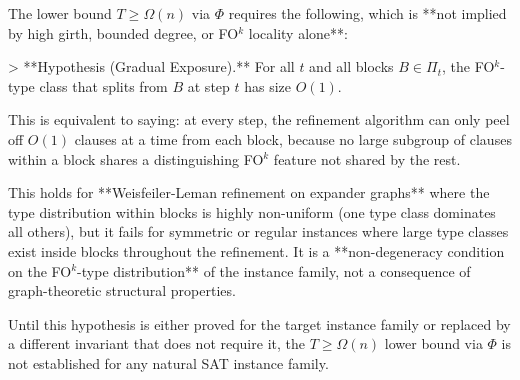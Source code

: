 The lower bound $T \geq \Omega(n)$ via $\Phi$ requires the following, which is **not implied by high girth, bounded degree, or FO$^k$ locality alone**:

> **Hypothesis (Gradual Exposure).** For all $t$ and all blocks $B \in \Pi_t$, the FO$^k$-type class that splits from $B$ at step $t$ has size $O(1)$.

This is equivalent to saying: at every step, the refinement algorithm can only peel off $O(1)$ clauses at a time from each block, because no large subgroup of clauses within a block shares a distinguishing FO$^k$ feature not shared by the rest.

This holds for **Weisfeiler-Leman refinement on expander graphs** where the type distribution within blocks is highly non-uniform (one type class dominates all others), but it fails for symmetric or regular instances where large type classes exist inside blocks throughout the refinement. It is a **non-degeneracy condition on the FO$^k$-type distribution** of the instance family, not a consequence of graph-theoretic structural properties.

Until this hypothesis is either proved for the target instance family or replaced by a different invariant that does not require it, the $T \geq \Omega(n)$ lower bound via $\Phi$ is not established for any natural SAT instance family.

